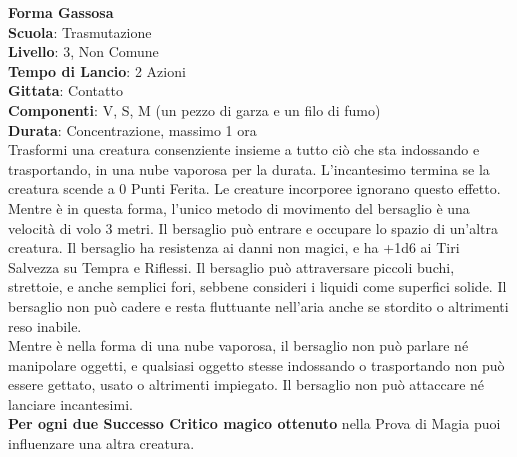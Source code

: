 \begin{multicols}{2}
\medskip\textbf{Forma Gassosa}\\
\textbf{Scuola}: Trasmutazione\\
\textbf{Livello}: 3, Non Comune\\
\textbf{Tempo di Lancio}: 2 Azioni\\
\textbf{Gittata}: Contatto\\
\textbf{Componenti}: V, S, M (un pezzo di garza e un filo di fumo)\\
\textbf{Durata}: Concentrazione, massimo 1 ora\\
Trasformi una creatura consenziente insieme a tutto ciò che sta indossando e trasportando, in una nube vaporosa per la durata. L'incantesimo termina se la creatura scende a 0 Punti Ferita. Le creature incorporee ignorano questo effetto. Mentre è in questa forma, l'unico metodo di movimento del bersaglio è una velocità di volo 3 metri. Il bersaglio può entrare e occupare lo spazio di un'altra creatura. Il bersaglio ha resistenza ai danni non magici, e ha +1d6 ai Tiri Salvezza su Tempra e Riflessi. Il bersaglio può attraversare piccoli buchi, strettoie, e anche semplici fori, sebbene consideri i liquidi come superfici solide. Il bersaglio non può cadere e resta fluttuante nell'aria anche se stordito o altrimenti reso inabile.\\
Mentre è nella forma di una nube vaporosa, il bersaglio non può parlare né manipolare oggetti, e qualsiasi oggetto stesse indossando o trasportando non può essere gettato, usato o altrimenti impiegato. Il bersaglio non può attaccare né lanciare incantesimi.\\
\textbf{Per ogni due Successo Critico magico ottenuto} nella Prova di Magia puoi influenzare una altra creatura.



\end{multicols}
